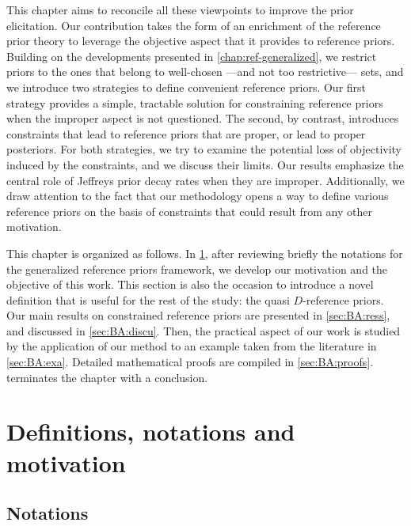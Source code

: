This chapter aims to reconcile all these viewpoints to improve the prior elicitation.
Our contribution takes the form of an enrichment of the reference prior theory to leverage the objective aspect that it provides to reference priors. Building on the developments presented in \cref{chap:ref-generalized},
we restrict priors to the ones that belong to  well-chosen ---and not too restrictive--- sets, and we introduce two strategies to define  convenient reference priors.
Our first strategy provides a simple,  tractable solution for constraining reference priors when the improper aspect is not questioned. The second, by contrast, introduces constraints that lead to  reference priors that are proper, or lead to proper posteriors. 
% 
For both strategies, we try to examine the potential loss of objectivity induced by the constraints, and we discuss their limits.
Our results emphasize the central role of Jeffreys prior decay rates when they are improper.
Additionally, we draw attention to the fact that our methodology opens a way to define various reference priors on the basis of constraints that could result from any other motivation.



This chapter is organized as follows.
In \cref{sec:BA:defsnotsmots}, after reviewing briefly the notations for the generalized reference priors framework, we develop our motivation and the objective of this work. This section is also the occasion to introduce a novel definition that is useful for the rest of the study: the quasi $D$-reference priors.
Our main results on constrained reference priors are presented in \cref{sec:BA:ress}, and discussed in \cref{sec:BA:discu}.
Then, the  practical aspect of our work is studied by the application of our method to an example taken from  the literature in \cref{sec:BA:exa}. Detailed mathematical proofs are compiled in \cref{sec:BA:proofs}.  terminates the chapter with a conclusion.


\section{Definitions, notations and motivation}\label{sec:BA:defsnotsmots}

\subsection{Notations}\label{sec:BA:nots}


